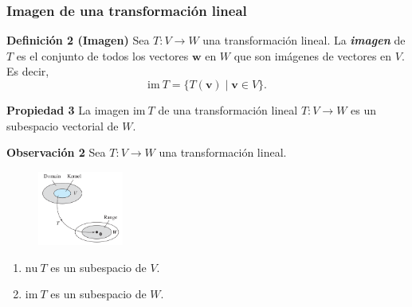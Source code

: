 {\nologo
\begin{frame}\frametitle{Imagen de una transformación lineal}

\vspace{-3mm}
\begin{block}{\textbf{Definición 2 (Imagen)}}
	\justifying
	Sea $T:V\to W$ una transformación lineal. La \textbf{\textit{imagen}} de $T$ es el conjunto de 
	todos los vectores $\mathbf{w}$ en $W$ que son imágenes de vectores en $V$. Es decir,
	\[
	\text{im}\ T = \{ T(\mathbf{v}) \mid \mathbf{v}\in V \}.
	\]
\end{block}

\vspace{-1mm}

\begin{prop}{\textbf{Propiedad 3}}
	\justifying
	La imagen $\text{im}\ T$ de una transformación lineal $T:V\to W$ es un subespacio vectorial de $W$.
\end{prop}	

\vspace{-1mm}

\begin{alertblock}{\textbf{Observación 2}}
	Sea $T:V \to W$ una transformación lineal.
	
	\vspace{-2mm}
	\begin{multicols}{2}
		\begin{figure}		
			\centering
			\includegraphics[width=0.25\textwidth]{imagenes/espacios}
		\end{figure}
				
		\begin{enumerate}
			\item[\labelname{$a$}] $\text{nu}\ T$ es un subespacio de $V$.\\[6mm]
			\item[\labelname{$b$}] $\text{im}\ T$ es un subespacio de $W$.
		\end{enumerate}
	\end{multicols}

\end{alertblock}

\end{frame}
}

